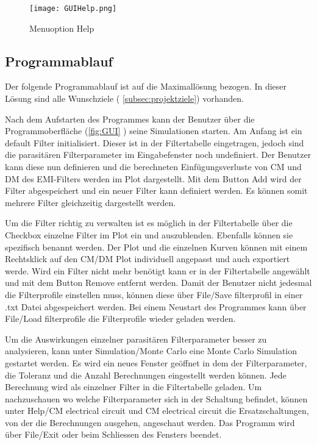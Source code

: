 \begin{figure}[H]
	\centering
	\texttt{[image: GUIHelp.png]}
	\caption{Menuoption Help}
	\label{fig:GUIHelp}
\end{figure}


\newpage

\subsection{Programmablauf} \label{subsec:programmablauf}

Der folgende Programmablauf ist auf die Maximallösung bezogen. In dieser Lösung sind alle Wunschziele ( \ref{subsec:projektziele}) vorhanden.

Nach dem Aufstarten des Programmes kann der Benutzer über die Programmoberfläche (\ref{fig:GUI} ) seine Simulationen starten.
Am Anfang ist ein default Filter initialisiert. Dieser ist in der Filtertabelle eingetragen, jedoch sind die parasitären Filterparameter im Eingabefenster noch undefiniert. Der Benutzer kann diese nun definieren und die berechneten Einfügungsverluste von CM und DM des EMI-Filters werden im Plot dargestellt. Mit dem Button Add wird der Filter abgespeichert und ein neuer Filter kann definiert werden. Es können somit mehrere Filter gleichzeitig dargestellt werden. 

Um die Filter richtig zu verwalten ist es möglich in der Filtertabelle über die Checkbox einzelne Filter im Plot ein und auszublenden. Ebenfalls können sie spezifisch benannt werden. Der Plot und die einzelnen Kurven können mit einem Rechtsklick auf den CM/DM Plot individuell angepasst und auch exportiert werde. Wird ein Filter nicht mehr benötigt kann er in der Filtertabelle angewählt und mit dem Button Remove entfernt werden. Damit der Benutzer nicht jedesmal die Filterprofile einstellen muss, können diese über File/Save filterprofil in einer .txt Datei abgespeichert werden. Bei einem Neustart des Programmes kann über File/Load filterprofile die Filterprofile wieder geladen werden. 

Um die Auswirkungen einzelner parasitären Filterparameter besser zu analysieren, kann unter Simulation/Monte Carlo eine Monte Carlo Simulation gestartet werden. Es wird ein neues Fenster geöffnet in dem der Filterparameter, die Toleranz und die Anzahl Berechnungen eingestellt werden können. Jede Berechnung wird als einzelner Filter in die Filtertabelle geladen. Um nachzuschauen wo welche Filterparameter sich in der Schaltung befindet, können unter Help/CM electrical circuit und CM electrical circuit die Ersatzschaltungen, von der die Berechnungen ausgehen, angeschaut werden. Das Programm wird über File/Exit oder beim Schliessen des Fensters beendet.

